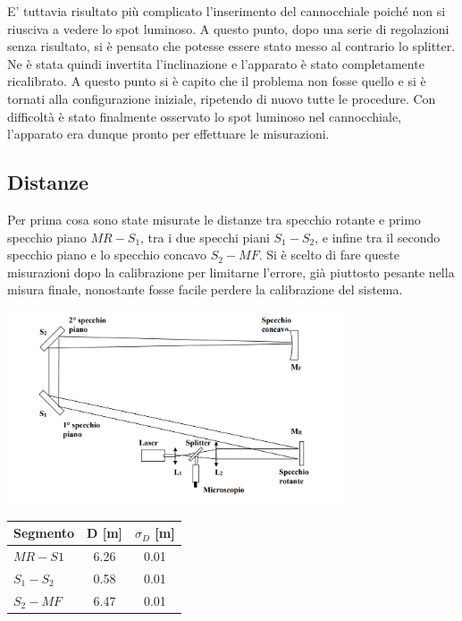 \documentclass[openright]{article}
\begin{document}
    E' tuttavia risultato più complicato l'inserimento del cannocchiale poiché non si riusciva a vedere lo spot luminoso. A questo punto, dopo una serie  di regolazioni senza risultato, si è pensato che potesse essere stato messo al contrario lo splitter. Ne è stata quindi invertita l'inclinazione e l'apparato è stato completamente ricalibrato. A questo punto si è capito che il problema non fosse quello e si è tornati alla configurazione iniziale, ripetendo di nuovo tutte le procedure. Con difficoltà è stato finalmente osservato lo spot luminoso nel cannocchiale, l'apparato era dunque pronto per effettuare le misurazioni. 
    
    \subsection{Distanze}
    Per prima cosa sono state misurate le distanze tra specchio rotante e primo specchio piano $MR-S_1$, tra i due specchi piani $S_1-S_2$, e infine tra il secondo specchio piano e lo specchio concavo $S_2-MF$. Si è scelto di fare queste misurazioni dopo la calibrazione per limitarne l'errore, già piuttosto pesante nella misura finale, nonostante fosse facile perdere la calibrazione del sistema. \\

    
    \begin{table}
        \begin{minipage}{0.6\linewidth}
            \centering
    		\includegraphics[width=10cm]{../images/apparato.png}
            
        \end{minipage}
        \begin{minipage}{0.4\linewidth}
            \centering
            \begin{tabular}{ l  c  c  } 
                    
                \toprule
                 Segmento & D [m] &  $\sigma_D$ [m] \\ 
                \midrule
                 $MR-S1$ & 6.26 & 0.01   \\ 
                 $S_1-S_2$ & 0.58 & 0.01  \\ 
                 $S_2-MF$ & 6.47 & 0.01  \\ 
                 
                \bottomrule                
            \end{tabular}
        \end{minipage}
    \end{table}
    
\end{document}
